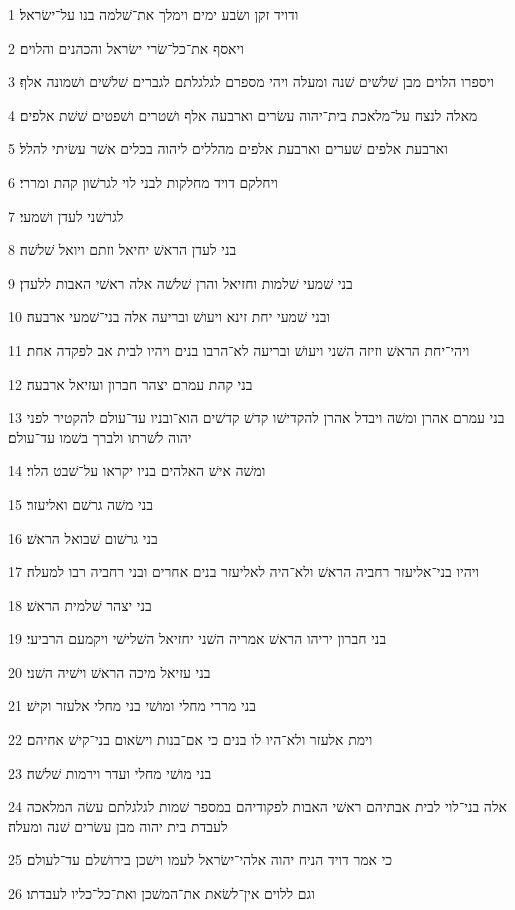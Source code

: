 \par 1 ודויד זקן ושׂבע ימים וימלך את־שׁלמה בנו על־ישׂראל׃
\par 2 ויאסף את־כל־שׂרי ישׂראל והכהנים והלוים׃
\par 3 ויספרו הלוים מבן שׁלשׁים שׁנה ומעלה ויהי מספרם לגלגלתם לגברים שׁלשׁים ושׁמונה אלף׃
\par 4 מאלה לנצח על־מלאכת בית־יהוה עשׂרים וארבעה אלף ושׁטרים ושׁפטים שׁשׁת אלפים׃
\par 5 וארבעת אלפים שׁערים וארבעת אלפים מהללים ליהוה בכלים אשׁר עשׂיתי להלל׃
\par 6 ויחלקם דויד מחלקות לבני לוי לגרשׁון קהת ומררי׃
\par 7 לגרשׁני לעדן ושׁמעי׃
\par 8 בני לעדן הראשׁ יחיאל וזתם ויואל שׁלשׁה׃
\par 9 בני שׁמעי שׁלמות וחזיאל והרן שׁלשׁה אלה ראשׁי האבות ללעדן׃
\par 10 ובני שׁמעי יחת זינא ויעושׁ ובריעה אלה בני־שׁמעי ארבעה׃
\par 11 ויהי־יחת הראשׁ וזיזה השׁני ויעושׁ ובריעה לא־הרבו בנים ויהיו לבית אב לפקדה אחת׃
\par 12 בני קהת עמרם יצהר חברון ועזיאל ארבעה׃
\par 13 בני עמרם אהרן ומשׁה ויבדל אהרן להקדישׁו קדשׁ קדשׁים הוא־ובניו עד־עולם להקטיר לפני יהוה לשׁרתו ולברך בשׁמו עד־עולם׃
\par 14 ומשׁה אישׁ האלהים בניו יקראו על־שׁבט הלוי׃
\par 15 בני משׁה גרשׁם ואליעזר׃
\par 16 בני גרשׁום שׁבואל הראשׁ׃
\par 17 ויהיו בני־אליעזר רחביה הראשׁ ולא־היה לאליעזר בנים אחרים ובני רחביה רבו למעלה׃
\par 18 בני יצהר שׁלמית הראשׁ׃
\par 19 בני חברון יריהו הראשׁ אמריה השׁני יחזיאל השׁלישׁי ויקמעם הרביעי׃
\par 20 בני עזיאל מיכה הראשׁ וישׁיה השׁני׃
\par 21 בני מררי מחלי ומושׁי בני מחלי אלעזר וקישׁ׃
\par 22 וימת אלעזר ולא־היו לו בנים כי אם־בנות וישׂאום בני־קישׁ אחיהם׃
\par 23 בני מושׁי מחלי ועדר וירמות שׁלשׁה׃
\par 24 אלה בני־לוי לבית אבתיהם ראשׁי האבות לפקודיהם במספר שׁמות לגלגלתם עשׂה המלאכה לעבדת בית יהוה מבן עשׂרים שׁנה ומעלה׃
\par 25 כי אמר דויד הניח יהוה אלהי־ישׂראל לעמו וישׁכן בירושׁלם עד־לעולם׃
\par 26 וגם ללוים אין־לשׂאת את־המשׁכן ואת־כל־כליו לעבדתו׃
